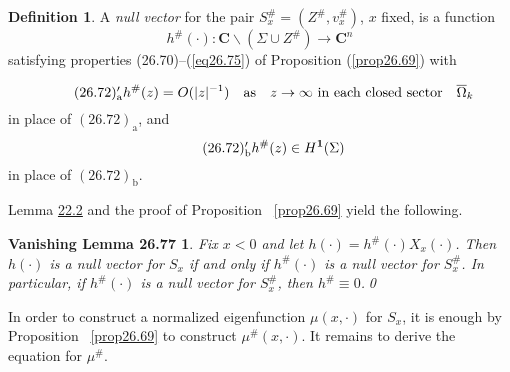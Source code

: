 \documentclass{surv-l}
\theoremstyle{plain}
\newtheorem*{vlem}{Vanishing Lemma 26.77}
\theoremstyle{definition}
\newtheorem{definition}[theorem]{Definition}
\numberwithin{equation}{chapter}
\begin{document}
\renewcommand\thetheorem{26.\arabic{theorem}}
\setcounter{theorem}{75}
\begin{definition}\label{eq26.76}
A \emph{null vector} for the pair $S_{x}^{\#}=(Z^{\#}, v_{x}^{\#})$, $x$ fixed, is a function
\begin{equation*}
h^{\#}(\cdot):\mathbf{C}\backslash (\Sigma\cup Z^{\#})\rightarrow \mathbf{C}^{n}
\end{equation*}
satisfying properties (26.70)--(\ref{eq26.75}) of Proposition (\ref{prop26.69}) with

\begin{equation*}
\tag*{$(26.72)'_{\mathrm{a}}$} h^{\#}(z)=O(|z|^{-1})\quad\mathrm{as}\quad  z\rightarrow\infty\text{ in each closed sector}\quad \overline{\Omega}_{k}
\end{equation*}
in place of $(26.72)_{\mathrm{a}}$, and
\begin{equation*}
\tag*{$(26.72)'_{\mathrm{b}}$} h^{\#}(z)\in H^\mathbf{1}(\Sigma)
\end{equation*}
in place of $(26.72)_{\mathrm{b}}$.

Lemma \hyperref[lem22.2]{22.2} and the proof of Proposition ~\ref{prop26.69} yield the following.
\end{definition}

\begin{vlem}\label{vlem26.77}
Fix $x<0$ and let $h(\cdot)=h^{\#}(\cdot)X_{x}(\cdot)$. Then $h(\cdot)$ is a null vector for $S_{x}$ if and only if $ h^{\#} (\cdot)$ is a null vector for $S_{x}^{\#}$. In particular, if $h^{\#}(\cdot)$ is a null vector for $ S_{x}^{\#}$, then $h^{\#}\equiv 0$.\qed
\end{vlem}

In order to construct a normalized eigenfunction $\mu(x, \cdot)$ for $S_{x}$, it is enough by Proposition ~\ref{prop26.69} to construct $\mu^{\#}(x,\cdot)$. It remains to derive the equation for $\mu^{\#}$.
\end{document}
